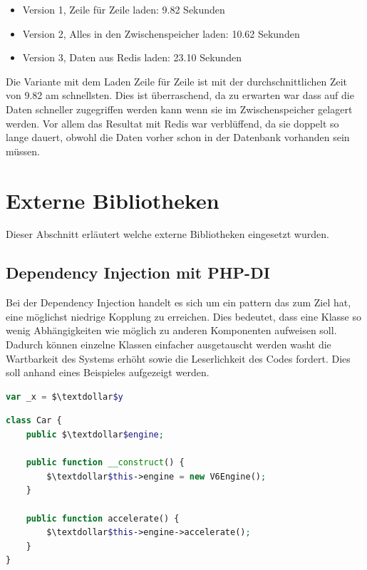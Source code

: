 \begin{itemize}
	\item Version 1, Zeile für Zeile laden: 9.82 Sekunden
	\item Version 2, Alles in den Zwischenspeicher laden: 10.62 Sekunden
	\item Version 3, Daten aus Redis laden: 23.10 Sekunden
\end{itemize}

Die Variante mit dem Laden Zeile für Zeile ist mit der durchschnittlichen Zeit von 9.82 am schnellsten. Dies ist überraschend, da zu erwarten war dass auf die Daten schneller zugegriffen werden kann wenn sie im Zwischenspeicher gelagert werden. Vor allem das Resultat mit Redis war verblüffend, da sie doppelt so lange dauert, obwohl die Daten vorher schon in der Datenbank vorhanden sein müssen.

\section{Externe Bibliotheken}
\label{sec:proofofconcept:externebibliotheken}
Dieser Abschnitt erläutert welche externe Bibliotheken eingesetzt wurden.

\subsection{Dependency Injection mit PHP-DI}
\label{sec:proofofconcept:dependency-injection}
Bei der Dependency Injection handelt es sich um ein \gls{pattern}
das zum Ziel hat, eine möglichst niedrige Kopplung zu erreichen. Dies bedeutet, dass eine Klasse so wenig Abhängigkeiten wie möglich zu anderen Komponenten aufweisen soll. Dadurch können einzelne Klassen einfacher ausgetauscht werden washt die Wartbarkeit des Systems erhöht sowie die Leserlichkeit des Codes fordert. Dies soll anhand eines Beispieles aufgezeigt werden.

\begin{lstlisting}[language=php]
var _x = $\textdollar$y
\end{lstlisting}

\begin{lstlisting}[language=php]
class Car {
	public $\textdollar$engine;
	
	public function __construct() {
		$\textdollar$this->engine = new V6Engine();
	}
	
	public function accelerate() {
		$\textdollar$this->engine->accelerate();
	}
}
\end{lstlisting}

